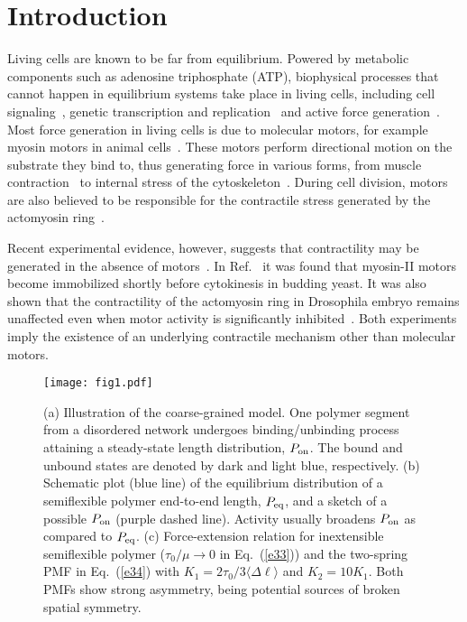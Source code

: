 \documentclass[twocolumn,prl,english]{revtex4-1}
\begin{document}
\section{Introduction}
Living cells are known to be far from equilibrium. Powered by metabolic components such as adenosine triphosphate (ATP), biophysical processes that cannot happen in equilibrium systems take place in living cells, including cell signaling~\cite{hernandez2012}, genetic transcription and replication~\cite{Murugan12034} and active force generation~\cite{Alberts}. Most force generation in living cells is due to molecular motors, for example myosin motors in animal cells~\cite{Fletcher2010485}. These motors perform directional motion on the substrate they bind to, thus generating force in various forms, from muscle contraction~\cite{Huxley1356} to internal stress of the cytoskeleton~\cite{Ingber2003, Marchetti2013,Markovich2019}. During cell division, motors are also believed to be responsible for the contractile stress generated by the actomyosin ring~\cite{Mabuchi1977,Guo1996,Straight2003,Glotzer2005}. 

Recent experimental evidence, however, suggests that contractility may be generated in the absence of motors~\cite{Wloka2013,Xue2016}. In Ref.~\cite{Wloka2013} it was found that myosin-II motors become immobilized shortly before cytokinesis in budding yeast. It was also shown that the contractility of the actomyosin ring in Drosophila embryo remains unaffected even when  motor activity is significantly inhibited~\cite{Xue2016}. Both experiments imply the existence of an underlying contractile mechanism other than molecular motors. 

\begin{figure*}[t]
	\centering
	\texttt{[image: fig1.pdf]}
	\caption{(a) Illustration of the coarse-grained model. One polymer segment from a disordered network undergoes binding/unbinding process attaining a steady-state length distribution, $P_{\rm on}$. 	
		The bound and unbound states are denoted by dark and light blue, respectively. 
		(b) Schematic plot (blue line) of the equilibrium distribution of a semiflexible polymer end-to-end length, $P_{\rm eq}$, and a sketch of a possible $P_{\rm on}$ (purple  dashed line). Activity usually broadens $P_{\rm on}$ as compared to $P_{\rm eq}$. 
		(c) Force-extension relation for inextensible semiflexible polymer ($\tau_0/\mu \to 0$ in Eq.~(\ref{e33})) and the two-spring PMF in Eq.~(\ref{e34}) with $K_1 = 2\tau_0/3\langle\Delta\ell\rangle$ and $K_2=10K_1$. Both PMFs show strong asymmetry, being potential sources of broken spatial symmetry. 
	}
	\label{fig_0}
\end{figure*}
\end{document}
